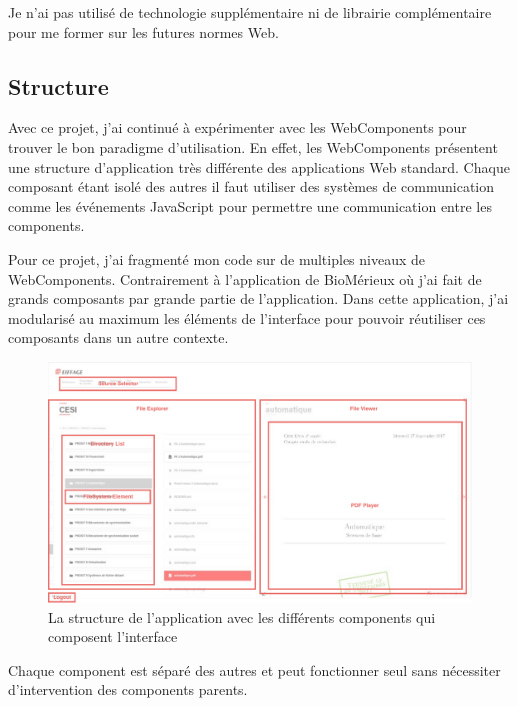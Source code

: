 Je n'ai pas utilisé de technologie supplémentaire ni de librairie complémentaire pour me former sur les futures normes Web.

\subsection{Structure}

Avec ce projet, j'ai continué à expérimenter avec les WebComponents pour trouver le bon paradigme d'utilisation.
En effet, les WebComponents présentent une structure d'application très différente des applications Web standard.
Chaque composant étant isolé des autres il faut utiliser des systèmes de communication comme les événements JavaScript pour permettre une communication entre les components.

Pour ce projet, j'ai fragmenté mon code sur de multiples niveaux de WebComponents.
Contrairement à l'application de BioMérieux où j'ai fait de grands composants par grande partie de l'application.
Dans cette application, j'ai modularisé au maximum les éléments de l'interface pour pouvoir réutiliser ces composants dans un autre contexte.

\begin{figure}[h]
    \centering
    \includegraphics[scale=0.5]{img/media-reader-structure.pdf}
    \caption{La structure de l'application avec les différents components qui composent l'interface}
\end{figure}

Chaque component est séparé des autres et peut fonctionner seul sans nécessiter d'intervention des components parents.

